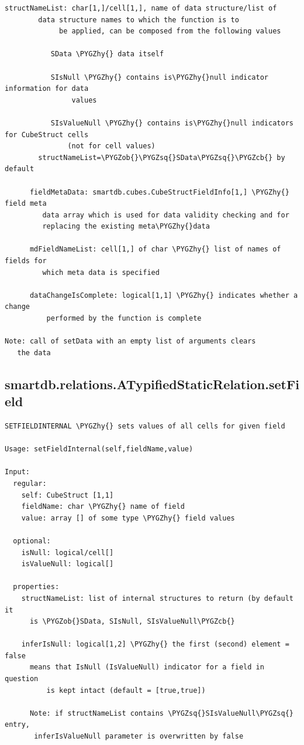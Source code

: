 \documentclass[letterpaper,10pt,english]{sphinxmanual}
\def\PYGZob{\char`\{}
\def\PYGZcb{\char`\}}
\def\PYGZhy{\char`\-}
\def\PYGZsq{\char`\'}
\begin{document}
\begin{Verbatim}[commandchars=\\\{\}]
      structNameList: char[1,]/cell[1,], name of data structure/list of
        data structure names to which the function is to
             be applied, can be composed from the following values

           SData \PYGZhy{} data itself

           SIsNull \PYGZhy{} contains is\PYGZhy{}null indicator information for data
                values

           SIsValueNull \PYGZhy{} contains is\PYGZhy{}null indicators for CubeStruct cells
               (not for cell values)
        structNameList=\PYGZob{}\PYGZsq{}SData\PYGZsq{}\PYGZcb{} by default

      fieldMetaData: smartdb.cubes.CubeStructFieldInfo[1,] \PYGZhy{} field meta
         data array which is used for data validity checking and for
         replacing the existing meta\PYGZhy{}data

      mdFieldNameList: cell[1,] of char \PYGZhy{} list of names of fields for
         which meta data is specified

      dataChangeIsComplete: logical[1,1] \PYGZhy{} indicates whether a change
          performed by the function is complete

Note: call of setData with an empty list of arguments clears
   the data
\end{Verbatim}


\subsection{smartdb.relations.ATypifiedStaticRelation.setField}
\label{chap_functions:smartdb-relations-atypifiedstaticrelation-setfield}
\begin{Verbatim}[commandchars=\\\{\}]
SETFIELDINTERNAL \PYGZhy{} sets values of all cells for given field

Usage: setFieldInternal(self,fieldName,value)

Input:
  regular:
    self: CubeStruct [1,1]
    fieldName: char \PYGZhy{} name of field
    value: array [] of some type \PYGZhy{} field values

  optional:
    isNull: logical/cell[]
    isValueNull: logical[]

  properties:
    structNameList: list of internal structures to return (by default it
      is \PYGZob{}SData, SIsNull, SIsValueNull\PYGZcb{}

    inferIsNull: logical[1,2] \PYGZhy{} the first (second) element = false
      means that IsNull (IsValueNull) indicator for a field in question
          is kept intact (default = [true,true])

      Note: if structNameList contains \PYGZsq{}SIsValueNull\PYGZsq{} entry,
       inferIsValueNull parameter is overwritten by false
\end{Verbatim}
\end{document}
